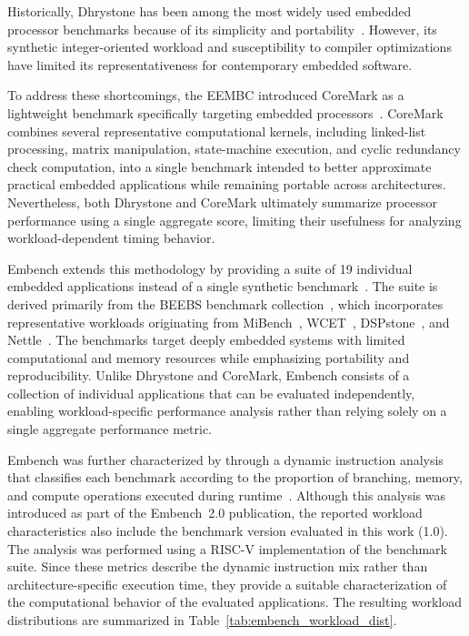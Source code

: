 \documentclass[conference]{IEEEtran}
\begin{document}
			Historically, Dhrystone has been among the most widely used embedded processor benchmarks because of its simplicity and portability~\cite{10.1145/358274.358283}.
			However, its synthetic integer-oriented workload and susceptibility to compiler optimizations have limited its representativeness for contemporary embedded software.

			To address these shortcomings, the \ac{EEMBC} introduced CoreMark as a lightweight benchmark specifically targeting embedded processors~\cite{gal2012exploring}.
			CoreMark combines several representative computational kernels, including linked-list processing, matrix manipulation, state-machine execution, and cyclic redundancy check computation, into a single benchmark intended to better approximate practical embedded applications while remaining portable across architectures.
			Nevertheless, both Dhrystone and CoreMark ultimately summarize processor performance using a single aggregate score, limiting their usefulness for analyzing workload-dependent timing behavior.

			Embench extends this methodology by providing a suite of 19 individual embedded applications instead of a single synthetic benchmark~\cite{EMBENCH-REPO,patterson2019embench}.
			The suite is derived primarily from the \ac{BEEBS} benchmark collection~\cite{pallister2013beebs}, which incorporates representative workloads originating from MiBench~\cite{990739}, WCET~\cite{Gustafsson:WCET2010:Benchmarks}, DSPstone~\cite{DSPstone}, and Nettle~\cite{Nettle}.
			The benchmarks target deeply embedded systems with limited computational and memory resources while emphasizing portability and reproducibility.
			Unlike Dhrystone and CoreMark, Embench consists of a collection of individual applications that can be evaluated independently, enabling workload-specific performance analysis rather than relying solely on a single aggregate performance metric.

			Embench was further characterized by \citeauthor{10970203} through a dynamic instruction analysis that classifies each benchmark according to the proportion of branching, memory, and compute operations executed during runtime~\cite{10970203}.
			Although this analysis was introduced as part of the Embench~2.0 publication, the reported workload characteristics also include the benchmark version evaluated in this work (1.0).
			The analysis was performed using a RISC-V implementation of the benchmark suite.
			Since these metrics describe the dynamic instruction mix rather than architecture-specific execution time, they provide a suitable characterization of the computational behavior of the evaluated applications.
			The resulting workload distributions are summarized in Table~\ref{tab:embench_workload_dist}.
\end{document}
